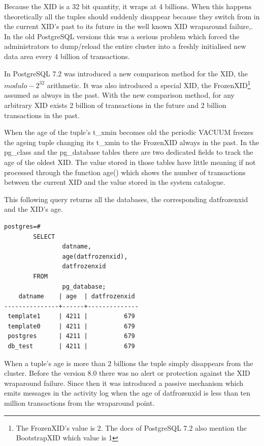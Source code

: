 Because the XID is a 32 bit quantity, it wraps at 4 billions. When this happens theoretically all 
the tuples should suddenly disappear because they switch from in the current XID's past to its future in 
the well known XID wraparound failure,. In the old PostgreSQL versions this 
was a serious problem which forced the administrators to dump/reload the entire cluster into a freshly 
initialised new data area every 4 billion of transactions.\newline 

In PostgreSQL 7.2 was introduced a new comparison method for the XID, the 
\begin{math}modulo-2^{32}\end{math} arithmetic. It was also introduced a special XID, the 
FrozenXID\footnote{The FrozenXID's value is 2. The docs of PostgreSQL 
7.2 also mention the BootstrapXID which value is 1} assumed as always in the past. With the new 
comparison method, for any arbitrary XID exists 2 billion of transactions in the future and 2 billion 
transactions in the past.\newline

When the age of the tuple's t\_xmin becomes old the periodic VACUUM freezes the ageing tuple 
changing its t\_xmin to the FrozenXID always in the past. In the pg\_class and the pg\_database tables 
there are  two dedicated fields to track the age of the oldest XID. The value stored in those tables 
have little meaning if not processed through the function age() which shows the number of transactions 
between the current XID and the value stored in the system catalogue. \newline

This following query returns all the databases, the corresponding datfrozenxid and the XID's age.\newpage

\begin{lstlisting}[style=pgsql]
 postgres=# 
        SELECT 
                datname,
                age(datfrozenxid),
                datfrozenxid 
        FROM 
                pg_database;
    datname    | age  | datfrozenxid 
---------------+------+--------------
 template1     | 4211 |          679
 template0     | 4211 |          679
 postgres      | 4211 |          679
 db_test       | 4211 |          679

\end{lstlisting}

When a tuple's age is more than 2 billions the tuple simply disappears  from the cluster. Before the 
version 8.0 there was no alert or protection against the XID wraparound failure. Since then it was 
introduced a passive mechanism which emits messages in the activity log when the age of datfrozenxid 
is less than ten million transactions from the wraparound point.

